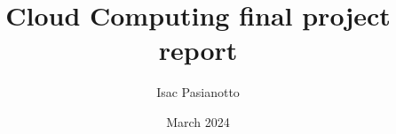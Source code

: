 \documentclass[a4paper]{article}
\begin{document}
\title{Cloud Computing final project report}
\author{Isac Pasianotto}
\date{March 2024}
\maketitle
\tableofcontents
\newpage



\newpage





\end{document}
